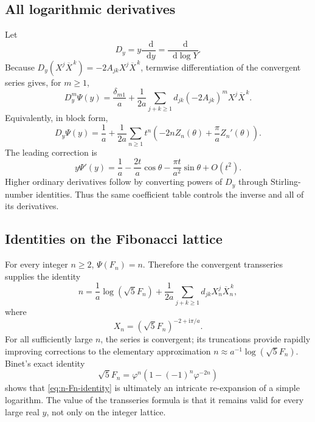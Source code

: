 \documentclass[11pt,oneside]{article}
\theoremstyle{plain}
\theoremstyle{definition}
\theoremstyle{remark}
\newcommand{\ii}{\mathrm{i}}
\newcommand{\dd}{\mathop{}\!\mathrm{d}}
\newcommand{\phig}{\varphi}
\begin{document}
\subsection{All logarithmic derivatives}

Let
\begin{equation}
 D_y=y\frac{\dd}{\dd y}=\frac{\dd}{\dd\log Y}.
 \label{eq:Dy}
\end{equation}
Because
\(D_y(X^j\overline X^{\,k})=-2A_{jk}X^j\overline X^{\,k}\), termwise
differentiation of the convergent series gives, for \(m\ge1\),
\begin{equation}
 \boxed{
 D_y^m\Psi(y)=\frac{\delta_{m1}}a
 +\frac1{2a}\sum_{j+k\ge1}
 d_{jk}(-2A_{jk})^mX^j\overline X^{\,k}.}
 \label{eq:all-log-derivatives}
\end{equation}
Equivalently, in block form,
\begin{equation}
 D_y\Psi(y)=\frac1a+\frac1{2a}\sum_{n\ge1}t^n
 \left(-2nZ_n(\theta)+\frac\pi aZ_n'(\theta)\right).
 \label{eq:first-log-derivative-block}
\end{equation}
The leading correction is
\begin{equation}
 y\Psi'(y)=\frac1a
 -\frac{2t}{a}\cos\theta
 -\frac{\pi t}{a^2}\sin\theta+O(t^2).
 \label{eq:Psi-prime-leading}
\end{equation}
Higher ordinary derivatives follow by converting powers of \(D_y\) through
Stirling-number identities.  Thus the same coefficient table controls the
inverse and all of its derivatives.

\subsection{Identities on the Fibonacci lattice}

For every integer \(n\ge2\), \(\Psi(F_n)=n\).  Therefore the convergent
transseries supplies the identity
\begin{equation}
 n=\frac1a\log(\sqrt5F_n)
 +\frac1{2a}\sum_{j+k\ge1}d_{jk}
 X_n^j\overline X_n^{\,k},
 \label{eq:n-Fn-identity}
\end{equation}
where
\begin{equation}
 X_n=(\sqrt5F_n)^{-2+\ii\pi/a}.
 \label{eq:Xn}
\end{equation}
For all sufficiently large \(n\), the series is convergent; its truncations
provide rapidly improving corrections to the elementary approximation
\(n\approx a^{-1}\log(\sqrt5F_n)\).  Binet's exact identity
\begin{equation}
 \sqrt5F_n=\phig^n\left(1-(-1)^n\phig^{-2n}\right)
 \label{eq:Binet-lattice}
\end{equation}
shows that \eqref{eq:n-Fn-identity} is ultimately an intricate re-expansion of
a simple logarithm.  The value of the transseries formula is that it remains
valid for every large real \(y\), not only on the integer lattice.
\end{document}

